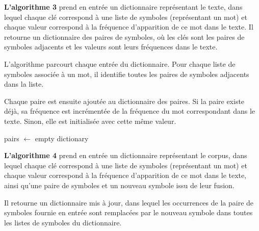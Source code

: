 \documentclass[12pt,a4paper]{report}
\begin{document}
\vspace{0.5cm}

\textbf{L’algorithme 3} prend en entrée un dictionnaire représentant le texte, dans lequel chaque clé correspond à une liste de symboles (représentant un mot) et chaque valeur correspond à la fréquence d’apparition de ce mot dans le texte. Il retourne un dictionnaire des paires de symboles, où les clés sont les paires de symboles adjacents et les valeurs sont leurs fréquences dans le texte.

L’algorithme parcourt chaque entrée du dictionnaire. Pour chaque liste de symboles associée à un mot, il identifie toutes les paires de symboles adjacents dans la liste.

Chaque paire est ensuite ajoutée au dictionnaire des paires. Si la paire existe déjà, sa fréquence est incrémentée de la fréquence du mot correspondant dans le texte. Sinon, elle est initialisée avec cette même valeur.

\begin{algorithm}[H]
	\caption{ComputePairs}
	
	pairs $\leftarrow$ empty dictionary\;
	
	
	
\end{algorithm}

\vspace{0.5cm}

\textbf{L’algorithme 4} prend en entrée un dictionnaire représentant le corpus, dans lequel chaque clé correspond à une liste de symboles (représentant un mot) et chaque valeur correspond à la fréquence d’apparition de ce mot dans le texte, ainsi qu’une paire de symboles et un nouveau symbole issu de leur fusion.

Il retourne un dictionnaire mis à jour, dans lequel les occurrences de la paire de symboles fournie en entrée sont remplacées par le nouveau symbole dans toutes les listes de symboles du dictionnaire.
\end{document}

